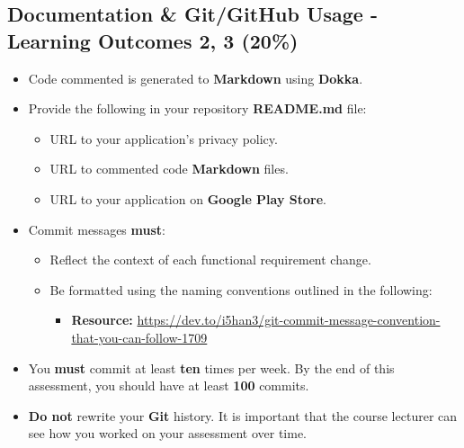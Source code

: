 \documentclass{article}
\begin{document}
\subsection*{Documentation \& Git/GitHub Usage - Learning Outcomes 2, 3 (20\%)}
\begin{itemize}
	\item Code commented is generated to \textbf{Markdown} using \textbf{Dokka}.
	\item Provide the following in your repository \textbf{README.md} file:
	      \begin{itemize}
	      	\item URL to your application's privacy policy.
	      	\item URL to commented code \textbf{Markdown} files.
	      	\item URL to your application on \textbf{Google Play Store}.
	      \end{itemize}			
	\item Commit messages \textbf{must}:
	\begin{itemize}
		\item Reflect the context of each functional requirement change. 
		\item Be formatted using the naming conventions outlined in the following:
		\begin{itemize}
			\item \textbf{Resource:} \small\href{https://dev.to/i5han3/git-commit-message-convention-that-you-can-follow-1709}{https://dev.to/i5han3/git-commit-message-convention-that-you-can-follow-1709}
		\end{itemize} 
	\end{itemize}
	\item You \textbf{must} commit at least \textbf{ten} times per week. By the end of this assessment, you should have at least \textbf{100} commits.
	\item \textbf{Do not} rewrite your \textbf{Git} history. It is important that the course lecturer can see how you worked on your assessment over time. 
\end{itemize}
\end{document}
